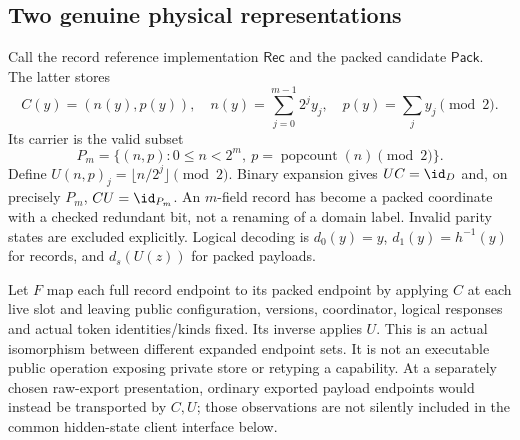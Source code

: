 \subsection{Two genuine physical representations}
Call the record reference implementation $\mathsf{Rec}$ and the packed
candidate $\mathsf{Pack}$. The latter stores
\begin{equation}\label{eq:B-codec}
C(y)=(n(y),p(y)),\quad n(y)=\sum_{j=0}^{m-1}2^jy_j,\quad
p(y)=\sum_jy_j\pmod2.
\end{equation}
Its carrier is the valid subset
\[
P_m=\{(n,p):0\leq n<2^m,\ p=\operatorname{popcount}(n)\pmod2\}.
\]
Define $U(n,p)_j=\lfloor n/2^j\rfloor\pmod2$. Binary expansion gives
$UC=\id_D$ and, on precisely $P_m$, $CU=\id_{P_m}$. An $m$-field record
has become a packed coordinate with a checked redundant bit, not a
renaming of a domain label. Invalid parity states are excluded explicitly.
Logical decoding is $d_0(y)=y$, $d_1(y)=h^{-1}(y)$ for records, and
$d_s(U(z))$ for packed payloads.

Let $F$ map each full record endpoint to its packed endpoint by applying
$C$ at each live slot and leaving public configuration, versions,
coordinator, logical responses and actual token identities/kinds fixed.
Its inverse applies $U$. This is an actual isomorphism between different
expanded endpoint sets. It is not an executable public operation exposing
private store or retyping a capability. At a separately chosen raw-export
presentation, ordinary exported payload endpoints would instead be
transported by $C,U$; those observations are not silently included in the
common hidden-state client interface below.

